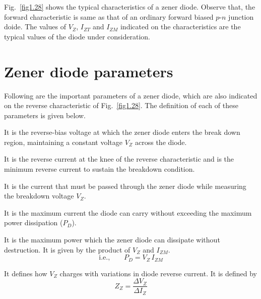 Fig.~\ref{fig1.28} shows the typical characteristics of a zener diode. Observe that, the forward characteristic is same as that of an ordinary forward biased $p$-$n$ junction doide. The values of $V_{Z}$, $I_{ZT}$ and $I_{ZM}$ indicated on the characteristics are the typical values of the diode under consideration.

\section{Zener diode parameters}\label{sec1.24}

Following are the important parameters of a zener diode, which are also indicated on the reverse characteristic of Fig.~\ref{fig1.28}. The definition of each of these parameters is given below.

\medskip
{}

\smallskip
It is the reverse-bias voltage at which the zener diode enters the break down region, maintaining a constant voltage $V_{Z}$ across the diode.

\medskip
{}

\smallskip
It is the reverse current at the knee of the reverse characteristic and is the minimum reverse current to sustain the breakdown condition.

\medskip
{}

\smallskip
It is the current that must be passed through the zener diode while measuring the breakdown voltage $V_{Z}$.

\medskip
{}

\smallskip
It is the maximum current the diode can carry without exceeding the maximum power dissipation ($P_{D}$).

\medskip
{}

\smallskip
It is the maximum power which the zener diode can dissipate without destruction. It is given by the product of $V_{Z}$ and $I_{ZM}$.
\begin{equation}
\text{i.e.,}\qquad P_{D}=V_{Z}\,I_{ZM}
\end{equation}

\medskip
{}

\smallskip
It defines how $V_{Z}$ charges with variations in diode reverse current. It is defined by
\begin{equation}
Z_{Z}=\dfrac{\Delta V_{Z}}{\Delta I_{Z}}
\end{equation}

